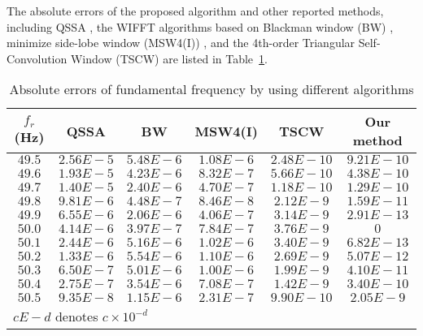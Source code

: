 \documentclass[journal,twoside]{IEEEtran}
\begin{document}
The absolute errors of the proposed algorithm and other reported methods, including QSSA \cite{Zhou2011}, the WIFFT algorithms based on Blackman window (BW) \cite{Harris1978}, minimize side-lobe window (MSW4(I)) \cite{Wen2011}, and the 4th-order Triangular Self-Convolution Window (TSCW) \cite{Wen2014} are listed in Table~\ref{table_2}.


\begin{table}
	\renewcommand{\arraystretch}{1.3}
	\caption{Absolute errors of fundamental frequency by using different algorithms}
	\label{table_2}
	\centering
	\begin{tabular}{@{ }c@{ }@{ }c@{ }@{ }c@{ }@{ }c@{ }@{ }c@{ }@{ }c@{ }}
		\toprule
		$f_r$ (Hz) & QSSA      & BW        & MSW4(I)   & TSCW       & \textbf{Our method}\\
		\midrule
		$49.5$     & $2.56E-5$ & $5.48E-6$ & $1.08E-6$ & $2.48E-10$ & $9.21E-10$ \\
		$49.6$     & $1.93E-5$ & $4.23E-6$ & $8.32E-7$ & $5.66E-10$ & $4.38E-10$ \\
		$49.7$     & $1.40E-5$ & $2.40E-6$ & $4.70E-7$ & $1.18E-10$ & $1.29E-10$ \\
		$49.8$     & $9.81E-6$ & $4.48E-7$ & $8.46E-8$ & $2.12E-9$  & $1.59E-11$ \\
		$49.9$     & $6.55E-6$ & $2.06E-6$ & $4.06E-7$ & $3.14E-9$  & $2.91E-13$ \\
		$50.0$     & $4.14E-6$ & $3.97E-7$ & $7.84E-7$ & $3.76E-9$  & $0$        \\
		$50.1$     & $2.44E-6$ & $5.16E-6$ & $1.02E-6$ & $3.40E-9$  & $6.82E-13$ \\
		$50.2$     & $1.33E-6$ & $5.54E-6$ & $1.10E-6$ & $2.69E-9$  & $5.07E-12$ \\
		$50.3$     & $6.50E-7$ & $5.01E-6$ & $1.00E-6$ & $1.99E-9$  & $4.10E-11$ \\
		$50.4$     & $2.75E-7$ & $3.54E-6$ & $7.08E-7$ & $1.42E-9$  & $3.40E-10$ \\
		$50.5$     & $9.35E-8$ & $1.15E-6$ & $2.31E-7$ & $9.90E-10$ & $2.05E-9$ \\
		\bottomrule
		\multicolumn{6}{l}{$cE-d$ denotes $c\times10^{-d}$}\\
	\end{tabular}
\end{table}
\end{document}
